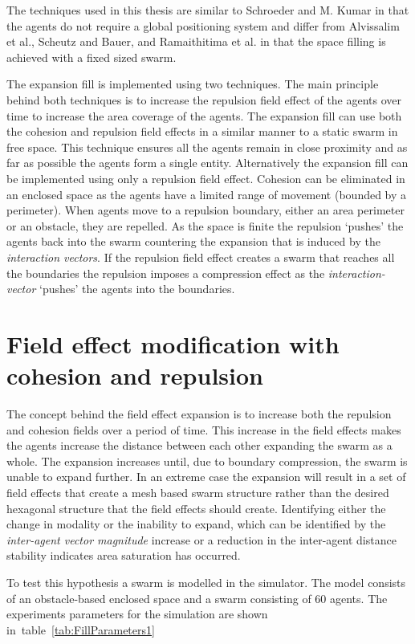 The techniques used in this thesis are similar to Schroeder and M. Kumar in that the agents do not require a global positioning system and differ from Alvissalim et al., Scheutz and Bauer, and Ramaithitima et al. in that the space filling is achieved with a fixed sized swarm. 

The expansion fill is implemented using two techniques. The main principle behind both techniques is to increase the repulsion field effect of the agents over time to increase the area coverage of the agents. The expansion fill can use both the cohesion and repulsion field effects in a similar manner to a static swarm in free space. This technique ensures all the agents remain in close proximity and as far as possible the agents form a single entity. Alternatively the expansion fill can be implemented using only a repulsion field effect. Cohesion can be eliminated in an enclosed space as the agents have a limited range of movement (bounded by a perimeter). When agents move to a repulsion boundary, either an area perimeter or an obstacle, they are repelled. As the space is finite the repulsion `pushes' the agents back into the swarm countering the expansion that is induced by the \textit{interaction vectors}. If the repulsion field effect creates a swarm that reaches all the boundaries the repulsion imposes a compression effect as the \textit{interaction-vector} `pushes' the agents into the boundaries. 

\section{Field effect modification with cohesion and repulsion}
The concept behind the field effect expansion is to increase both the repulsion and cohesion fields over a period of time. This increase in the field effects makes the agents increase the distance between each other expanding the swarm as a whole. The expansion increases until, due to boundary compression, the swarm is unable to expand further. In an extreme case the expansion will result in a set of field effects that create a mesh based swarm structure rather than the desired hexagonal structure that the field effects should create. Identifying either the change in modality or the inability to expand, which can be identified by the \textit{inter-agent vector magnitude} increase or a reduction in the inter-agent distance stability indicates area saturation has occurred.

To test this hypothesis a swarm is modelled in the simulator. The model consists of an obstacle-based enclosed space and a swarm consisting of 60 agents. The experiments parameters for the simulation are shown in~table~\ref{tab:FillParameters1}

